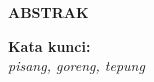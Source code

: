 \clearpage
{}
\begin{center}
  \textbf{\large ABSTRAK}\\[3em]
\end{center}

\blindtext{}


\noindent \textbf{Kata kunci:}\\
\emph{pisang, goreng, tepung}
